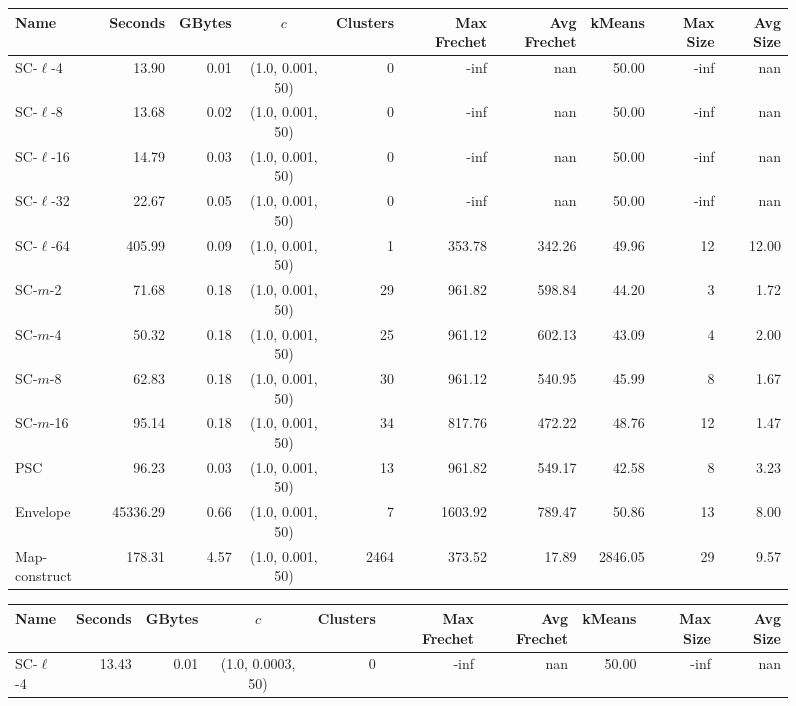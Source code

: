 \documentclass[11pt]{article}
\begin{document}
\begin{figure} \begin{center}
    \begin{minipage}{\textwidth}
    {
    \begin{tabular}{@{}lrrcrrrrrr@{}}
        \toprule
        Name & Seconds & GBytes & $c$ & Clusters & Max Frechet & Avg Frechet & kMeans & Max Size & Avg Size\\
        \midrule
        SC-$\ell$-4 & 13.90 & 0.01 & (1.0, 0.001, 50) & 0 & -inf & nan & 50.00 & -inf & nan\\
        SC-$\ell$-8 & 13.68 & 0.02 & (1.0, 0.001, 50) & 0 & -inf & nan & 50.00 & -inf & nan\\
        SC-$\ell$-16 & 14.79 & 0.03 & (1.0, 0.001, 50) & 0 & -inf & nan & 50.00 & -inf & nan\\
        SC-$\ell$-32 & 22.67 & 0.05 & (1.0, 0.001, 50) & 0 & -inf & nan & 50.00 & -inf & nan\\
        SC-$\ell$-64 & 405.99 & 0.09 & (1.0, 0.001, 50) & 1 & 353.78 & 342.26 & 49.96 & 12 & 12.00\\
        SC-$m$-2 & 71.68 & 0.18 & (1.0, 0.001, 50) & 29 & 961.82 & 598.84 & 44.20 & 3 & 1.72\\
        SC-$m$-4 & 50.32 & 0.18 & (1.0, 0.001, 50) & 25 & 961.12 & 602.13 & 43.09 & 4 & 2.00\\
        SC-$m$-8 & 62.83 & 0.18 & (1.0, 0.001, 50) & 30 & 961.12 & 540.95 & 45.99 & 8 & 1.67\\
        SC-$m$-16 & 95.14 & 0.18 & (1.0, 0.001, 50) & 34 & 817.76 & 472.22 & 48.76 & 12 & 1.47\\
        PSC & 96.23 & 0.03 & (1.0, 0.001, 50) & 13 & 961.82 & 549.17 & 42.58 & 8 & 3.23\\
        Envelope & 45336.29 & 0.66 & (1.0, 0.001, 50) & 7 & 1603.92 & 789.47 & 50.86 & 13 & 8.00\\
        Map-construct & 178.31 & 4.57 & (1.0, 0.001, 50) & 2464 & 373.52 & 17.89 & 2846.05 & 29 & 9.57\\
        \bottomrule
    \end{tabular}
    }
    {
    \begin{tabular}{@{}lrrcrrrrrr@{}}
        \toprule
        Name & Seconds & GBytes & $c$ & Clusters & Max Frechet & Avg Frechet & kMeans & Max Size & Avg Size\\
        \midrule
        SC-$\ell$-4 & 13.43 & 0.01 & (1.0, 0.0003, 50) & 0 & -inf & nan & 50.00 & -inf & nan\\

\end{tabular}}
\end{minipage}
\end{center}
\end{figure}
\end{document}
